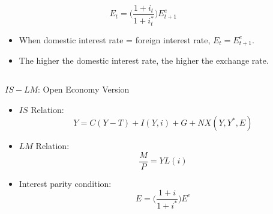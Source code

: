 \documentclass[shownotes,11pt, aspectratio=169]{beamer}
\begin{document}
\begin{frame}
\begin{columns}[T] %
\begin{column}{.36\textwidth}
 \[ E_t = \Bigg(\frac{1 + i_t}{1 + i_t^{\ast}}\Bigg)E_{t+1}^e \]
 \begin{itemize}
  \item When domestic interest rate = foreign interest rate, $E_t = E_{t+1}^e$.
  \item The higher the domestic interest rate, the higher the exchange rate.
\end{itemize}
\end{column}
\hfill
\pause
\begin{column}{.44\textwidth}
\end{column}
\end{columns}
\end{frame}

\begin{frame}{$IS-LM$: Open Economy Version}
\begin{itemize}
\item $IS$ Relation:
     \[ Y = C(Y - T) + I(Y,i) + G + NX(Y,Y^{\ast}, E) \]
\pause
\item $LM$ Relation:
     \[ \frac{M}{P} = YL(i) \]
\pause
\item Interest parity condition:
     \[ E = \Bigg(\frac{1 + i}{1 + i^{\ast}}\Bigg)E^e \]
\end{itemize}
\end{frame}
\end{document}
